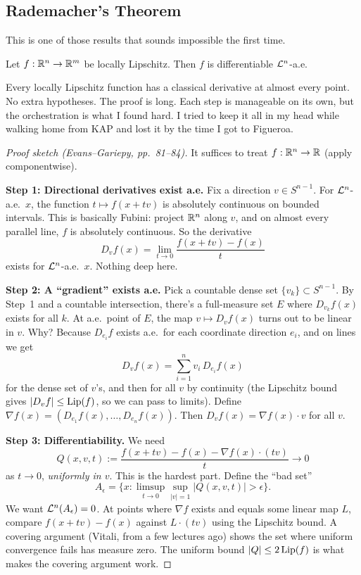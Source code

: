 \subsection{Rademacher's Theorem}

This is one of those results that sounds impossible the first time.

\begin{theorem}[Rademacher]
\label{thm:rademacher}
Let $f : \mathbb{R}^n \to \mathbb{R}^m$ be locally Lipschitz. Then $f$ is differentiable $\mathcal{L}^n$-a.e.
\end{theorem}

Every locally Lipschitz function has a classical derivative at almost every point. No extra hypotheses. The proof is long. Each step is manageable on its own, but the orchestration is what I found hard. I tried to keep it all in my head while walking home from KAP and lost it by the time I got to Figueroa.

\begin{proof}[Proof sketch (Evans--Gariepy, pp.~81--84)]
It suffices to treat $f : \mathbb{R}^n \to \mathbb{R}$ (apply componentwise).

\medskip
\noindent\textbf{Step 1: Directional derivatives exist a.e.}
Fix a direction $v \in S^{n-1}$. For $\mathcal{L}^n$-a.e.\ $x$, the function $t \mapsto f(x + tv)$ is absolutely continuous on bounded intervals. This is basically Fubini: project $\mathbb{R}^n$ along $v$, and on almost every parallel line, $f$ is absolutely continuous. So the derivative
\[
  D_v f(x) = \lim_{t \to 0} \frac{f(x + tv) - f(x)}{t}
\]
exists for $\mathcal{L}^n$-a.e.\ $x$. Nothing deep here.

\medskip
\noindent\textbf{Step 2: A ``gradient'' exists a.e.}
Pick a countable dense set $\{v_k\} \subset S^{n-1}$. By Step~1 and a countable intersection, there's a full-measure set $E$ where $D_{v_k} f(x)$ exists for all $k$. At a.e.\ point of $E$, the map $v \mapsto D_v f(x)$ turns out to be linear in $v$. Why? Because $D_{e_i} f$ exists a.e.\ for each coordinate direction $e_i$, and on lines we get
\[
  D_v f(x) = \sum_{i=1}^n v_i \, D_{e_i} f(x)
\]
for the dense set of $v$'s, and then for all $v$ by continuity (the Lipschitz bound gives $|D_v f| \leq \operatorname{Lip}(f)$, so we can pass to limits). Define $\nabla f(x) = (D_{e_1} f(x), \ldots, D_{e_n} f(x))$. Then $D_v f(x) = \nabla f(x) \cdot v$ for all $v$.

\medskip
\noindent\textbf{Step 3: Differentiability.}
We need
\[
  Q(x, v, t) := \frac{f(x + tv) - f(x) - \nabla f(x) \cdot (tv)}{t} \to 0
\]
as $t \to 0$, \emph{uniformly in $v$}. This is the hardest part. Define the ``bad set''
\[
  A_\epsilon = \bigl\{ x : \limsup_{t \to 0} \sup_{|v|=1} |Q(x, v, t)| > \epsilon \bigr\}.
\]
We want $\mathcal{L}^n(A_\epsilon) = 0$. At points where $\nabla f$ exists and equals some linear map $L$, compare $f(x + tv) - f(x)$ against $L \cdot (tv)$ using the Lipschitz bound. A covering argument (Vitali, from a few lectures ago) shows the set where uniform convergence fails has measure zero. The uniform bound $|Q| \leq 2\operatorname{Lip}(f)$ is what makes the covering argument work.
\end{proof}

